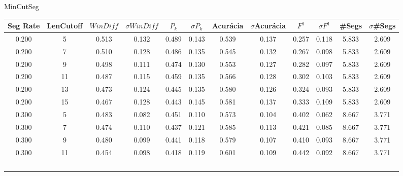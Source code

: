 
 \newpage
\center MinCutSeg
\begin{longtable}[c]{|c|c|c|c|c|c|c|c|c|c|c|c|} 
\hline 
 Seg Rate & LenCutoff & $WinDiff$ & $\sigma$$WinDiff$ & $P_k$ & $\sigma$$P_k$ & Acurácia & $\sigma$Acurácia & $F^1$ & $\sigma$$F^1$ & \#Segs & $\sigma$\#Segs\\ \hline 
 0.200 & 5 & 0.513 & 0.132 & 0.489 & 0.143 & 0.539 & 0.137 & 0.257 & 0.118 & 5.833 & 2.609  \\ \hline 
  0.200 & 7 & 0.510 & 0.128 & 0.486 & 0.135 & 0.545 & 0.132 & 0.267 & 0.098 & 5.833 & 2.609  \\ \hline 
  0.200 & 9 & 0.498 & 0.111 & 0.474 & 0.130 & 0.553 & 0.127 & 0.282 & 0.097 & 5.833 & 2.609  \\ \hline 
  0.200 & 11 & 0.487 & 0.115 & 0.459 & 0.135 & 0.566 & 0.128 & 0.302 & 0.103 & 5.833 & 2.609  \\ \hline 
  0.200 & 13 & 0.473 & 0.124 & 0.445 & 0.135 & 0.580 & 0.126 & 0.324 & 0.093 & 5.833 & 2.609  \\ \hline 
  0.200 & 15 & 0.467 & 0.128 & 0.443 & 0.145 & 0.581 & 0.137 & 0.333 & 0.109 & 5.833 & 2.609  \\ \hline 
  0.300 & 5 & 0.483 & 0.082 & 0.451 & 0.110 & 0.573 & 0.104 & 0.402 & 0.062 & 8.667 & 3.771  \\ \hline 
  0.300 & 7 & 0.474 & 0.110 & 0.437 & 0.121 & 0.585 & 0.113 & 0.421 & 0.085 & 8.667 & 3.771  \\ \hline 
  0.300 & 9 & 0.480 & 0.099 & 0.441 & 0.118 & 0.579 & 0.107 & 0.410 & 0.093 & 8.667 & 3.771  \\ \hline 
  0.300 & 11 & 0.454 & 0.098 & 0.418 & 0.119 & 0.601 & 0.109 & 0.442 & 0.092 & 8.667 & 3.771  \\ \hline 
$$
\end{longtable}
